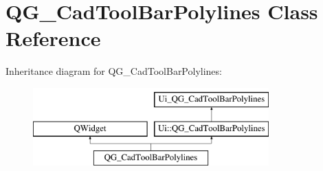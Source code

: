 \hypertarget{classQG__CadToolBarPolylines}{\section{Q\-G\-\_\-\-Cad\-Tool\-Bar\-Polylines Class Reference}
\label{classQG__CadToolBarPolylines}
}
Inheritance diagram for Q\-G\-\_\-\-Cad\-Tool\-Bar\-Polylines\-:\begin{figure}[H]
\begin{center}
\leavevmode
\includegraphics[height=3.000000cm]{classQG__CadToolBarPolylines}
\end{center}
\end{figure}
